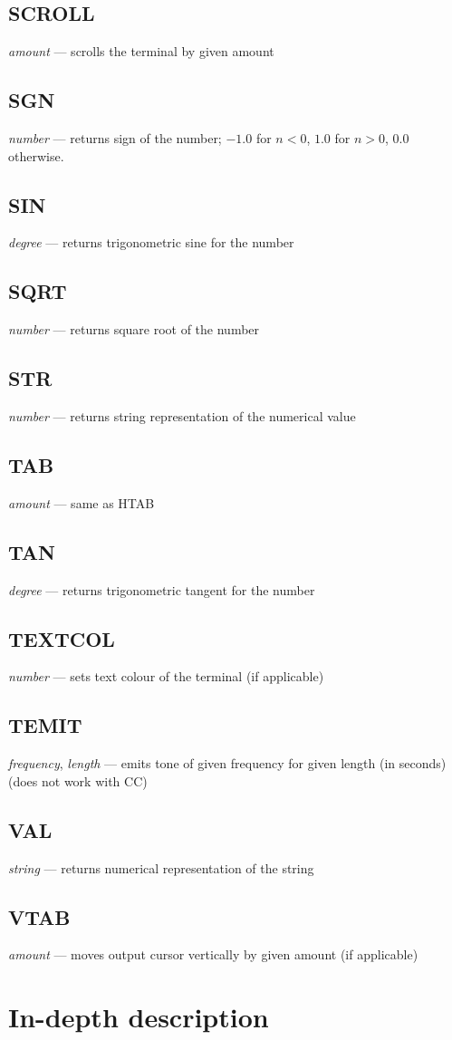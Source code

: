 \subsection{SCROLL} \emph{amount} --- scrolls the terminal by given amount
\subsection{SGN} \emph{number} --- returns sign of the number; $ -1.0 $ for $ n < 0 $, $ 1.0 $ for $ n > 0 $, $ 0.0 $ otherwise.
\subsection{SIN} \emph{degree} --- returns trigonometric sine for the number
\subsection{SQRT} \emph{number} --- returns square root of the number
\subsection{STR} \emph{number} --- returns string representation of the numerical value
\subsection{TAB} \emph{amount} --- same as HTAB
\subsection{TAN} \emph{degree} --- returns trigonometric tangent for the number
\subsection{TEXTCOL} \emph{number} --- sets text colour of the terminal (if applicable)
\subsection{TEMIT} \emph{frequency}, \emph{length} --- emits tone of given frequency for given length (in seconds) (does not work with CC)
\subsection{VAL} \emph{string} --- returns numerical representation of the string
\subsection{VTAB} \emph{amount} --- moves output cursor vertically by given amount (if applicable)

\section{In-depth description}